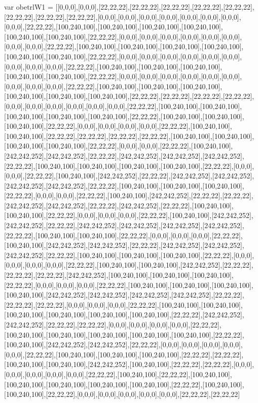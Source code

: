 var obetrlW1 = [[0,0,0],[0,0,0],[22,22,22],[22,22,22],[22,22,22],[22,22,22],[22,22,22],[22,22,22],[22,22,22],[22,22,22],[0,0,0],[0,0,0],[0,0,0],[0,0,0],[0,0,0],[0,0,0],[0,0,0],[0,0,0],[22,22,22],[100,240,100],[100,240,100],[100,240,100],[100,240,100],[100,240,100],[100,240,100],[22,22,22],[0,0,0],[0,0,0],[0,0,0],[0,0,0],[0,0,0],[0,0,0],[0,0,0],[0,0,0],[22,22,22],[100,240,100],[100,240,100],[100,240,100],[100,240,100],[100,240,100],[100,240,100],[22,22,22],[0,0,0],[0,0,0],[0,0,0],[0,0,0],[0,0,0],[0,0,0],[0,0,0],[0,0,0],[0,0,0],[22,22,22],[100,240,100],[100,240,100],[100,240,100],[100,240,100],[100,240,100],[22,22,22],[0,0,0],[0,0,0],[0,0,0],[0,0,0],[0,0,0],[0,0,0],[0,0,0],[0,0,0],[0,0,0],[22,22,22],[100,240,100],[100,240,100],[100,240,100],[100,240,100],[100,240,100],[100,240,100],[22,22,22],[22,22,22],[22,22,22],[22,22,22],[0,0,0],[0,0,0],[0,0,0],[0,0,0],[0,0,0],[0,0,0],[22,22,22],[100,240,100],[100,240,100],[100,240,100],[100,240,100],[100,240,100],[22,22,22],[100,240,100],[100,240,100],[100,240,100],[22,22,22],[0,0,0],[0,0,0],[0,0,0],[0,0,0],[22,22,22],[100,240,100],[100,240,100],[22,22,22],[22,22,22],[22,22,22],[22,22,22],[100,240,100],[100,240,100],[100,240,100],[100,240,100],[22,22,22],[0,0,0],[0,0,0],[22,22,22],[100,240,100],[242,242,252],[242,242,252],[22,22,22],[242,242,252],[242,242,252],[242,242,252],[22,22,22],[100,240,100],[100,240,100],[100,240,100],[100,240,100],[22,22,22],[0,0,0],[0,0,0],[22,22,22],[100,240,100],[242,242,252],[22,22,22],[242,242,252],[242,242,252],[242,242,252],[242,242,252],[22,22,22],[100,240,100],[100,240,100],[100,240,100],[22,22,22],[0,0,0],[0,0,0],[22,22,22],[100,240,100],[242,242,252],[22,22,22],[22,22,22],[242,242,252],[242,242,252],[22,22,22],[242,242,252],[22,22,22],[100,240,100],[100,240,100],[22,22,22],[0,0,0],[0,0,0],[0,0,0],[22,22,22],[100,240,100],[242,242,252],[242,242,252],[22,22,22],[242,242,252],[242,242,252],[242,242,252],[242,242,252],[22,22,22],[100,240,100],[100,240,100],[22,22,22],[0,0,0],[0,0,0],[0,0,0],[22,22,22],[100,240,100],[242,242,252],[242,242,252],[22,22,22],[242,242,252],[242,242,252],[242,242,252],[22,22,22],[100,240,100],[100,240,100],[100,240,100],[22,22,22],[0,0,0],[0,0,0],[0,0,0],[0,0,0],[22,22,22],[100,240,100],[100,240,100],[242,242,252],[22,22,22],[22,22,22],[22,22,22],[242,242,252],[100,240,100],[100,240,100],[100,240,100],[22,22,22],[0,0,0],[0,0,0],[0,0,0],[22,22,22],[100,240,100],[100,240,100],[100,240,100],[100,240,100],[242,242,252],[242,242,252],[242,242,252],[242,242,252],[22,22,22],[22,22,22],[22,22,22],[0,0,0],[0,0,0],[0,0,0],[22,22,22],[100,240,100],[100,240,100],[100,240,100],[100,240,100],[100,240,100],[100,240,100],[22,22,22],[242,242,252],[242,242,252],[22,22,22],[22,22,22],[0,0,0],[0,0,0],[0,0,0],[0,0,0],[22,22,22],[100,240,100],[100,240,100],[100,240,100],[100,240,100],[100,240,100],[22,22,22],[100,240,100],[242,242,252],[242,242,252],[22,22,22],[0,0,0],[0,0,0],[0,0,0],[0,0,0],[0,0,0],[22,22,22],[100,240,100],[100,240,100],[100,240,100],[22,22,22],[22,22,22],[100,240,100],[100,240,100],[242,242,252],[100,240,100],[22,22,22],[22,22,22],[0,0,0],[0,0,0],[0,0,0],[0,0,0],[0,0,0],[22,22,22],[100,240,100],[22,22,22],[100,240,100],[100,240,100],[100,240,100],[100,240,100],[100,240,100],[22,22,22],[100,240,100],[100,240,100],[22,22,22],[0,0,0],[0,0,0],[0,0,0],[0,0,0],[0,0,0],[22,22,22],[22,22,22]